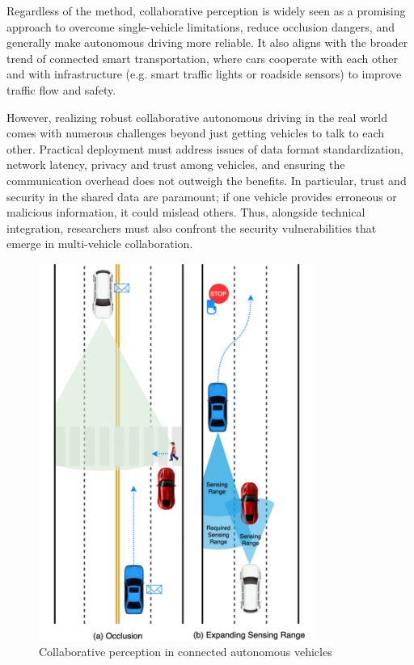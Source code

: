 Regardless of the method, collaborative perception is widely seen as a promising approach to overcome single-vehicle limitations, reduce occlusion dangers, and generally make autonomous driving more reliable.
It also aligns with the broader trend of connected smart transportation, where cars cooperate with each other and with infrastructure (e.g. smart traffic lights or roadside sensors) to improve traffic flow and safety.

However, realizing robust collaborative autonomous driving in the real world comes with numerous challenges beyond just getting vehicles to talk to each other. Practical deployment must address issues of data format standardization, network latency, privacy and trust among vehicles, and ensuring the communication overhead does not outweigh the benefits.
In particular, trust and security in the shared data are paramount; if one vehicle provides erroneous or malicious information, it could mislead others. Thus, alongside technical integration, researchers must also confront the security vulnerabilities that emerge in multi-vehicle collaboration.

\begin{figure}[tph]
    \centering
    \includegraphics[width=0.8\textwidth]{figures/introduction/permission-settings.png}
    \caption{Collaborative perception in connected autonomous vehicles}
    \label{fig:permission-settings}
\end{figure}

